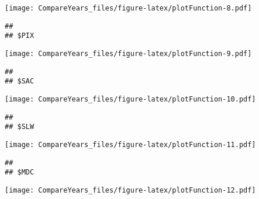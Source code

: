 \documentclass[
]{article}
\begin{document}
\texttt{[image: CompareYears\_files/figure-latex/plotFunction-8.pdf]}

\begin{verbatim}
## 
## $PIX
\end{verbatim}

\texttt{[image: CompareYears\_files/figure-latex/plotFunction-9.pdf]}

\begin{verbatim}
## 
## $SAC
\end{verbatim}

\texttt{[image: CompareYears\_files/figure-latex/plotFunction-10.pdf]}

\begin{verbatim}
## 
## $SLW
\end{verbatim}

\texttt{[image: CompareYears\_files/figure-latex/plotFunction-11.pdf]}

\begin{verbatim}
## 
## $MDC
\end{verbatim}

\texttt{[image: CompareYears\_files/figure-latex/plotFunction-12.pdf]}
\end{document}
